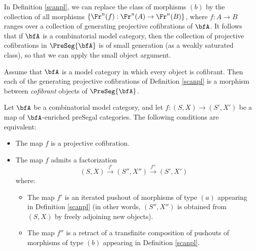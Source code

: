 \begin{remark}\label{smuther}
In Definition \ref{scanpl}, we can replace the class of morphisms $(b)$ by the collection 
of all morphisms $\{ \Fr^n(f): \Fr^n(A) \rightarrow \Fr^n(B) \}$, where $f: A \rightarrow B$ ranges over
a collection of generating projective cofibrations of $\bfA$. It follows that if $\bfA$ is a combinatorial model category, then the collection of projective cofibrations in
$\PreSeg{\bfA}$ is of small generation (as a weakly saturated class), so that we can apply the small object argument.
\end{remark}

\begin{remark}\label{soccer}
Assume that $\bfA$ is a model category in which every object is cofibrant.
Then each of the generating projective cofibrations of Definition \ref{scanpl} is a morphism between {\em cofibrant} objects
of $\PreSeg{\bfA}$.
\end{remark}

\begin{lemma}\label{spottus}
Let $\bfA$ be a combinatorial model category, and let $f: (S,X) \rightarrow (S', X')$ be a map of $\bfA$-enriched preSegal categories. The following conditions are equivalent:
\begin{itemize}
\item[$(1)$] The map $f$ is a projective cofibration.
\item[$(2)$] The map $f$ admits a factorization
$$ (S,X) \stackrel{f'}{\rightarrow} (S'', X'') \stackrel{f''}{\rightarrow} (S', X')$$
where:
\begin{itemize}
\item The map $f'$ is an iterated pushout of morphisms of type $(a)$ appearing in Definition \ref{scanpl}
(in other words, $(S'', X'')$ is obtained from $(S,X)$ by freely adjoining new objects).
\item The map $f''$ is a retract of a transfinite composition of pushouts of morphisms of type
$(b)$ appearing in Definition \ref{scanpl}.
\end{itemize}
\end{itemize}
\end{lemma}

